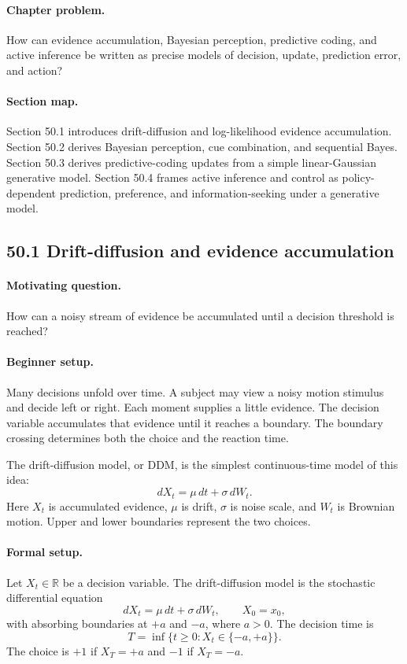 \paragraph{Chapter problem.}
How can evidence accumulation, Bayesian perception, predictive coding, and active inference be written as precise models of decision, update, prediction error, and action?

\paragraph{Section map.}
Section 50.1 introduces drift-diffusion and log-likelihood evidence accumulation. Section 50.2 derives Bayesian perception, cue combination, and sequential Bayes. Section 50.3 derives predictive-coding updates from a simple linear-Gaussian generative model. Section 50.4 frames active inference and control as policy-dependent prediction, preference, and information-seeking under a generative model.

\subsection{50.1 Drift-diffusion and evidence accumulation}

\paragraph{Motivating question.}
How can a noisy stream of evidence be accumulated until a decision threshold is reached?

\paragraph{Beginner setup.}
Many decisions unfold over time. A subject may view a noisy motion stimulus and decide left or right. Each moment supplies a little evidence. The decision variable accumulates that evidence until it reaches a boundary. The boundary crossing determines both the choice and the reaction time.

The drift-diffusion model, or DDM, is the simplest continuous-time model of this idea:
\[
dX_t=\mu\,dt+\sigma\,dW_t.
\]
Here \(X_t\) is accumulated evidence, \(\mu\) is drift, \(\sigma\) is noise scale, and \(W_t\) is Brownian motion. Upper and lower boundaries represent the two choices.

\paragraph{Formal setup.}
Let \(X_t\in\mathbb R\) be a decision variable. The drift-diffusion model is the stochastic differential equation
\[
\boxed{
dX_t=\mu\,dt+\sigma\,dW_t,\qquad X_0=x_0,
}
\]
with absorbing boundaries at \(+a\) and \(-a\), where \(a>0\). The decision time is
\[
T=\inf\{t\geq0:X_t\in\{-a,+a\}\}.
\]
The choice is \(+1\) if \(X_T=+a\) and \(-1\) if \(X_T=-a\).

